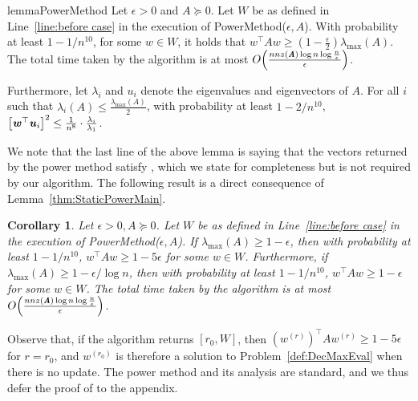 \documentclass[11pt]{article}
\newtheorem{corollary}[theorem]{Corollary}
\let\originalleft\left
\let\originalright\right
\renewcommand{\left}{\mathopen{}\mathclose\bgroup\originalleft}
\renewcommand{\right}{\aftergroup\egroup\originalright}
\newcommand\uu{\boldsymbol{\mathit{u}}}
\newcommand\ww{\boldsymbol{\mathit{w}}}
\renewcommand\AA{\boldsymbol{\mathit{A}}}
\newcommand\WW{\boldsymbol{\mathit{W}}}
\begin{document}
\begin{restatable}{lemma}{PowerMethod}\label{thm:StaticPowerMain}
Let $\epsilon>0$ and $\AA \succeq 0$. Let $\WW$ be as defined in Line~\ref{line:before case} in the execution of {\sc PowerMethod}($\epsilon,\AA$). With probability at least $1-1/n^{10}$, for some $\ww \in \WW$, it holds that $\ww^{\top}\AA\ww \geq (1-\frac{\epsilon}{2})\lambda_{\max}(\AA)$. The total time taken by the algorithm is at most $O\left(\frac{nnz(\AA)\log n\log \frac{n}{\epsilon}}{\epsilon}\right)$.

Furthermore, let $\lambda_i$ and $\uu_i$ denote the eigenvalues and eigenvectors of $\AA$. For all $i$ such that $\lambda_i (\AA) \leq \frac{\lambda_{\max}(\AA)}{2}$, with probability at least $1-2/n^{10}$, $\left[\ww^{\top}\uu_i\right]^2\leq \frac{1}{n^8}\cdot \frac{\lambda_i}{\lambda_1}$.
\end{restatable}
 We note that the last line of the above lemma is saying that the vectors returned by the power method satisfy , which we state for completeness but is not required by our algorithm. The following result is a direct consequence of Lemma~\ref{thm:StaticPowerMain}.

 \begin{corollary}\label{thm:StaticPower}
 Let $\epsilon>0, \AA \succeq 0$. Let $\WW$ be as defined in Line~\ref{line:before case} in the execution of {\sc PowerMethod}($\epsilon,\AA$). If $\lambda_{\max}(\AA) \ge 1-\epsilon$, then with probability at least $1-1/n^{10}$, $\ww^{\top}\AA\ww\geq 1-5\epsilon$ for some $\ww\in \WW$. Furthermore, if $\lambda_{\max}(\AA) \ge 1-\epsilon/\log n$, then with probability at least $1-1/n^{10}$, $\ww^{\top}\AA\ww\geq 1-\epsilon$ for some $\ww\in \WW$. The total time taken by the algorithm is at most $O\left(\frac{nnz(\AA)\log n\log \frac{n}{\epsilon}}{\epsilon}\right)$.
 \end{corollary}

Observe that, if the algorithm returns $[r_0,\WW]$, then $(\ww^{(r)})^{\top}\AA\ww^{(r)}\geq 1-5\epsilon$ for $r=r_0$, and $\ww^{(r_0)}$ is therefore a solution to Problem~\ref{def:DecMaxEval} when there is no update. The power method and its analysis are standard, and we thus defer the proof of  to the appendix. 
\end{document}
